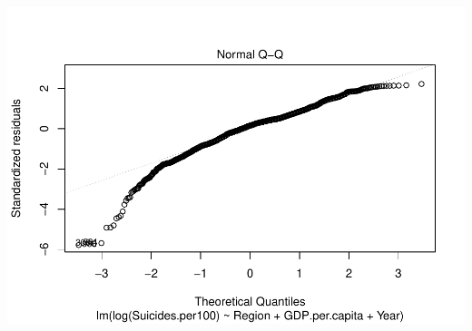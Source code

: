 \documentclass[11pt,]{article}
\begin{document}
\includegraphics{An-Analysis-of-Suicide-Data_files/figure-latex/unnamed-chunk-7-2.pdf}
\end{document}
